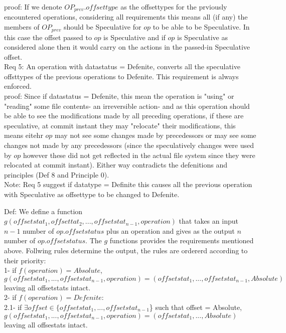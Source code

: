 \documentclass[a4paper, 11pt]{article}
\begin{document}
proof: If we denote $OP_{prev}.offsettype$ as the offsettypes for the prviously encountered operations, considering all requirements this means all (if any) the members of $OP_{prev}$ should be Speculative for $op$ to be able to be Speculative. In this case the offset passed to $op$ is Speculative and if $op$ is Speculative as considered alone then it would carry on the actions in the passed-in Speculative offset.\\ 

Req 5: An operation with datastatus = Defenite, converts all the speculative offsttypes of the previous operations to Defenite. This requirement is always enforced.\\

proof: Since if datastatus = Defenite, this mean the operation is "using" or "reading" some file contents- an irreversible action- and as this operation should be able to see the modifications made by all preceding operations, if these are speculative, at commit instant they may "relocate" their modifications, this means eitehr $op$ may not see some changes made by precedessors or may see some changes not made by any precedessors (since the speculatively changes were used by $op$ however these did not get reflected in the actual file system since they were relocated at commit instant). Either way contradicts the defenitions and principles (Def 8 and Principle 0).\\

Note: Req 5 suggest if datatype = Definite this causes all the previous operation with Speculative as offsettype to be changed to Defenite.

Def: We define a function $g(offsetstat_1, offsettat_2, ..., offsetstat_{n-1}, operation)$ that takes an input  $n-1$ number of $op.offsetstatus$ plus an operation and gives as the output $n$ number of $op.offsetstatus$. The $g$ functions provides the requirements mentioned above. Follwing rules determine the output, the rules are ordererd according to their priority:\\

1- if $f(operation) = Absolute$, $g(offsetstat_1, ..., {offsetstat_{n-1}}, operation) = ({offsetstat_1}, ..., {offsetstat_{n-1}}, Absolute)$ leaving all offsetstats intact.\\

2- if $f(operation) = Defenite$:\\

\hspace{ 8mm}
	2.1- if $\exists offset \in \{offsetstat_1, ..., offsetstat_{n-1}$\} such that offset = Absolute,  $g(offsetstat_1, ..., offsetstat_{n-1}, operation) = (offsetstat_1, ... ,Absolute)$ leaving all offsestats intact.\\ 
\end{document}
